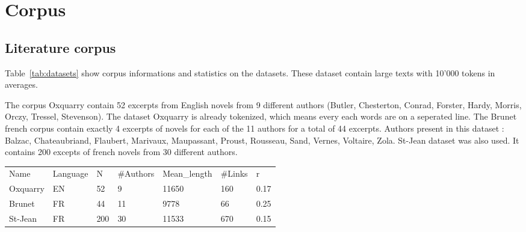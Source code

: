 \section{Corpus}

\subsection{Literature corpus}

Table~\ref{tab:datasets} show corpus informations and statistics on the datasets.
These dataset contain large texts with 10'000 tokens in averages.

The corpus Oxquarry contain 52 excerpts from English novels from 9 different authors (Butler, Chesterton, Conrad, Forster, Hardy, Morris, Orczy, Tressel, Stevenson).
The dataset Oxquarry is already tokenized, which means every each words are on a seperated line.
The Brunet french corpus contain exactly 4 excerpts of novels for each of the 11 authors for a total of 44 excerpts.
Authors present in this dataset : Balzac, Chateaubriand, Flaubert, Marivaux, Maupassant, Proust, Rousseau, Sand, Vernes, Voltaire, Zola.
St-Jean dataset was also used.
It contains 200 excepts of french novels from 30 different authors.




\begin{table*}[t]
  \caption{General information on the datasets}
  \label{tab:datasets}
  \begin{tabular}{|l|l|l|l|l|l|l|}
    Name & Language & N & \#Authors & Mean\_length & \#Links & r \\
    Oxquarry & EN & 52 & 9 & 11650 & 160 & 0.17\\
    Brunet & FR & 44 & 11 & 9778 & 66 & 0.25\\
    St-Jean & FR & 200 & 30 & 11533 & 670 & 0.15\\
  \end{tabular}
\end{table*}



\subsection{}
